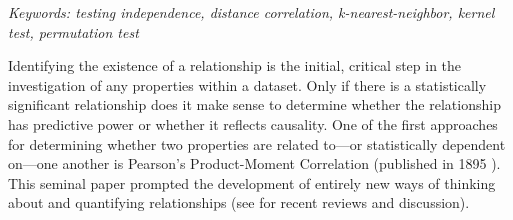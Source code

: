 \documentclass[11pt]{article}
\begin{document}


\noindent%
{\it Keywords: testing independence, distance correlation, k-nearest-neighbor, kernel test, permutation test}

\clearpage
\setcounter{tocdepth}{2}


Identifying the existence of a relationship is the initial, critical step in the investigation of any properties within a dataset. Only if there is a statistically significant relationship does it make sense to determine whether the relationship has predictive power or whether it reflects causality.
One of the first approaches for determining whether two properties are related to---or statistically dependent on---one another is Pearson's Product-Moment Correlation (published in 1895 \cite{Pearson1895}). This seminal paper prompted the development of  entirely new ways of thinking about and quantifying relationships (see \cite{Reimherr2013,JosseHolmes2013} for  recent reviews and discussion).
\end{document}
